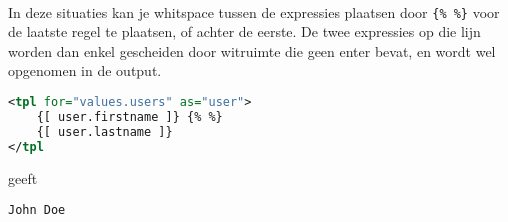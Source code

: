 \paragraph {} In deze situaties kan je whitspace tussen de expressies plaatsen door
\lstinline|{% %}| voor de laatste regel te plaatsen, of achter de eerste. De twee
expressies op die lijn worden dan enkel gescheiden door witruimte die geen enter bevat, en
wordt wel opgenomen in de output.

\begin{lstlisting}[language=xml]
<tpl for="values.users" as="user">
	{[ user.firstname ]} {% %}
	{[ user.lastname ]}
</tpl
\end{lstlisting}

geeft

\begin{lstlisting}
John Doe
\end{lstlisting}

